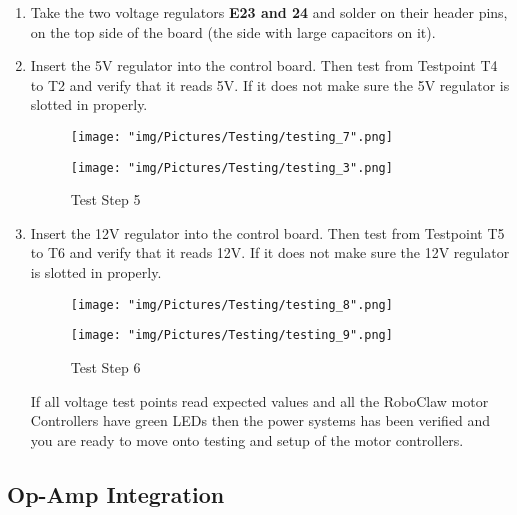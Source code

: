 \documentclass[12pt]{article}
\begin{document}
\begin{enumerate}
\item Take the two voltage regulators \textbf{E23 and 24} and solder on their header pins, on the top side of the board (the side with large capacitors on it). 

\item Insert the 5V regulator into the control board. Then test from Testpoint T4 to T2 and verify that it reads 5V. If it does not make sure the 5V regulator is slotted in properly.

\begin{figure}[H]
  \centering
  \begin{minipage}[b]{0.45\textwidth}
    \texttt{[image: "img/Pictures/Testing/testing\_7".png]}
  \end{minipage}
  \hfill
  \begin{minipage}[b]{0.45\textwidth}
    \texttt{[image: "img/Pictures/Testing/testing\_3".png]}
  \end{minipage}
  \caption{Test Step 5}
  \label{test_5}
\end{figure}

\item Insert the 12V regulator into the control board. Then test from Testpoint T5 to T6 and verify that it reads 12V. If it does not make sure the 12V regulator is slotted in properly.

\begin{figure}[H]
  \centering
  \begin{minipage}[b]{0.45\textwidth}
    \texttt{[image: "img/Pictures/Testing/testing\_8".png]}
  \end{minipage}
  \hfill
  \begin{minipage}[b]{0.45\textwidth}
    \texttt{[image: "img/Pictures/Testing/testing\_9".png]}
  \end{minipage}
  \caption{Test Step 6}
  \label{test_6}
\end{figure}

If all voltage test points read expected values and all the RoboClaw motor Controllers have green LEDs then the power systems has been verified and you are ready to move onto testing and setup of the motor controllers. 

\end{enumerate}

\subsection{Op-Amp Integration}
\end{document}
